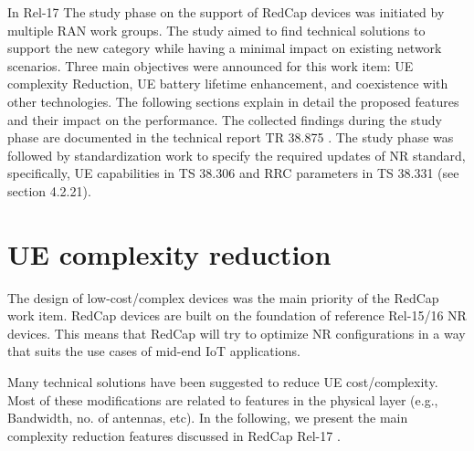 \documentclass[]{IEEEtran}
\begin{document}
In Rel-17 The study phase on the support of RedCap devices was initiated by multiple RAN work groups. The study aimed to find technical solutions to support the new category while having a minimal impact on existing network scenarios. Three main objectives were announced for this work item: UE complexity Reduction, UE battery lifetime enhancement, and coexistence with other technologies. The following sections explain in detail the proposed features and their impact on the performance. The collected findings during the study phase are documented in the technical report TR 38.875 \cite{3gpp_study_2021_38.875}. The study phase was followed by standardization work to specify the required updates of NR standard, specifically,  UE capabilities in TS 38.306 \cite{3gpp_nr_nodate-4_38.306} and RRC parameters in TS 38.331 \cite{3gpp_nr_nodate-3_38.331} (see section 4.2.21).

\section{UE complexity reduction}
\label{sec:4-complexity-reduction}






The design of low-cost/complex devices was the main priority of the RedCap work item. RedCap devices are built on the foundation of reference Rel-15/16 NR devices. This means that RedCap will try to optimize NR configurations in a way that suits the use cases of mid-end IoT applications.

Many technical solutions have been suggested to reduce UE cost/complexity. Most of these modifications are related to features in the physical layer (e.g., Bandwidth, no. of antennas, etc). In the following, we present the main complexity reduction features discussed in RedCap Rel-17 \cite{3gpp_study_2021_38.875}.
\end{document}

